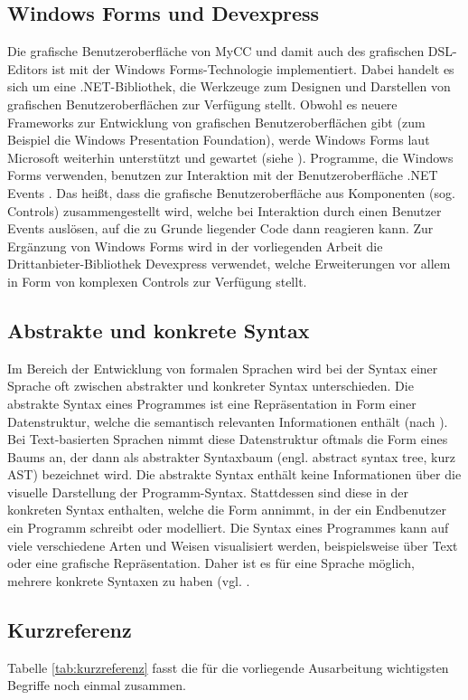 \subsection{Windows Forms und Devexpress}
Die grafische Benutzeroberfläche von MyCC und damit auch des grafischen DSL-Editors ist mit der Windows Forms-Technologie implementiert. Dabei handelt es sich um eine .NET-Bibliothek, die Werkzeuge zum Designen und Darstellen von grafischen Benutzeroberflächen zur Verfügung stellt. Obwohl es neuere Frameworks zur Entwicklung von grafischen Benutzeroberflächen gibt (zum Beispiel die Windows Presentation Foundation), werde Windows Forms laut Microsoft weiterhin unterstützt und gewartet (siehe \cite{Allen:14}). Programme, die Windows Forms verwenden, benutzen zur Interaktion mit der Benutzeroberfläche .NET Events \cite[S. 171ff]{Platt:03}. Das heißt, dass die grafische Benutzeroberfläche aus Komponenten (sog. Controls) zusammengestellt wird, welche bei Interaktion durch einen Benutzer Events auslösen, auf die zu Grunde liegender Code dann reagieren kann. Zur Ergänzung von Windows Forms wird in der vorliegenden Arbeit die Drittanbieter-Bibliothek Devexpress verwendet, welche Erweiterungen vor allem in Form von komplexen Controls zur Verfügung stellt. 

\subsection{Abstrakte und konkrete Syntax}
Im Bereich der Entwicklung von formalen Sprachen wird bei der Syntax einer Sprache oft zwischen abstrakter und konkreter Syntax unterschieden. Die abstrakte Syntax eines Programmes ist eine Repräsentation in Form einer Datenstruktur, welche die semantisch relevanten Informationen enthält (nach \cite[S. 26]{Voelter:13}). Bei Text-basierten Sprachen nimmt diese Datenstruktur oftmals die Form eines Baums an, der dann als abstrakter Syntaxbaum (engl. abstract syntax tree, kurz AST) bezeichnet wird. Die abstrakte Syntax enthält keine Informationen über die visuelle Darstellung der Programm-Syntax. Stattdessen sind diese in der konkreten Syntax enthalten, welche die Form annimmt, in der ein Endbenutzer ein Programm schreibt oder modelliert. Die Syntax eines Programmes kann auf viele verschiedene Arten und Weisen visualisiert werden, beispielsweise über Text oder eine grafische Repräsentation. Daher ist es für eine Sprache möglich, mehrere konkrete Syntaxen zu haben (vgl. \cite[S. 6f]{Kleppe:09}.

\subsection{Kurzreferenz}
Tabelle \ref{tab:kurzreferenz} fasst die für die vorliegende Ausarbeitung wichtigsten Begriffe noch einmal zusammen.


